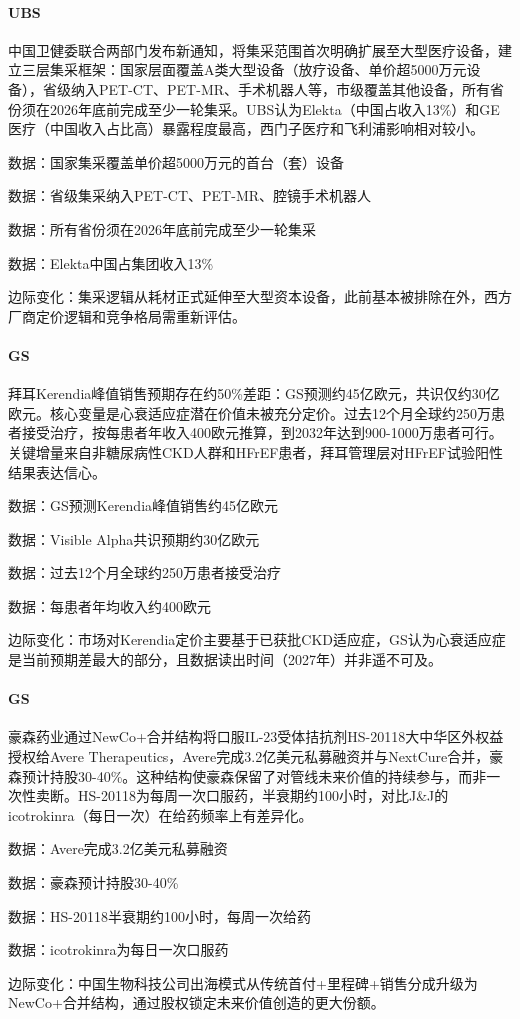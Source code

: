 \documentclass[11pt]{ctexart}
\begin{document}
\paragraph{UBS} 中国卫健委联合两部门发布新通知，将集采范围首次明确扩展至大型医疗设备，建立三层集采框架：国家层面覆盖A类大型设备（放疗设备、单价超5000万元设备），省级纳入PET-CT、PET-MR、手术机器人等，市级覆盖其他设备，所有省份须在2026年底前完成至少一轮集采。UBS认为Elekta（中国占收入13\%）和GE医疗（中国收入占比高）暴露程度最高，西门子医疗和飞利浦影响相对较小。
{\small\color{refgray}数据：国家集采覆盖单价超5000万元的首台（套）设备\par}
{\small\color{refgray}数据：省级集采纳入PET-CT、PET-MR、腔镜手术机器人\par}
{\small\color{refgray}数据：所有省份须在2026年底前完成至少一轮集采\par}
{\small\color{refgray}数据：Elekta中国占集团收入13\%\par}
{\small\color{refgray}边际变化：集采逻辑从耗材正式延伸至大型资本设备，此前基本被排除在外，西方厂商定价逻辑和竞争格局需重新评估。\par}
\paragraph{GS} 拜耳Kerendia峰值销售预期存在约50\%差距：GS预测约45亿欧元，共识仅约30亿欧元。核心变量是心衰适应症潜在价值未被充分定价。过去12个月全球约250万患者接受治疗，按每患者年收入400欧元推算，到2032年达到900-1000万患者可行。关键增量来自非糖尿病性CKD人群和HFrEF患者，拜耳管理层对HFrEF试验阳性结果表达信心。
{\small\color{refgray}数据：GS预测Kerendia峰值销售约45亿欧元\par}
{\small\color{refgray}数据：Visible Alpha共识预期约30亿欧元\par}
{\small\color{refgray}数据：过去12个月全球约250万患者接受治疗\par}
{\small\color{refgray}数据：每患者年均收入约400欧元\par}
{\small\color{refgray}边际变化：市场对Kerendia定价主要基于已获批CKD适应症，GS认为心衰适应症是当前预期差最大的部分，且数据读出时间（2027年）并非遥不可及。\par}
\paragraph{GS} 豪森药业通过NewCo+合并结构将口服IL-23受体拮抗剂HS-20118大中华区外权益授权给Avere Therapeutics，Avere完成3.2亿美元私募融资并与NextCure合并，豪森预计持股30-40\%。这种结构使豪森保留了对管线未来价值的持续参与，而非一次性卖断。HS-20118为每周一次口服药，半衰期约100小时，对比J\&J的icotrokinra（每日一次）在给药频率上有差异化。
{\small\color{refgray}数据：Avere完成3.2亿美元私募融资\par}
{\small\color{refgray}数据：豪森预计持股30-40\%\par}
{\small\color{refgray}数据：HS-20118半衰期约100小时，每周一次给药\par}
{\small\color{refgray}数据：icotrokinra为每日一次口服药\par}
{\small\color{refgray}边际变化：中国生物科技公司出海模式从传统首付+里程碑+销售分成升级为NewCo+合并结构，通过股权锁定未来价值创造的更大份额。\par}
\end{document}
